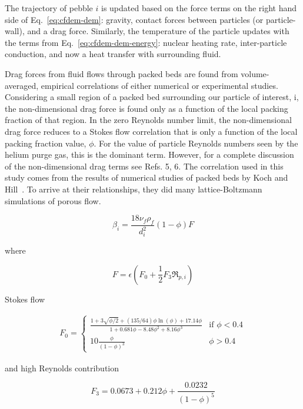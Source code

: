 The trajectory of pebble $i$ is updated based on the force terms on the right hand side of Eq.~\ref{eq:cfdem-dem}: gravity, contact forces between particles (or particle-wall), and a drag force. Similarly, the temperature of the particle updates with the terms from Eq.~\ref{eq:cfdem-dem-energy}: nuclear heating rate, inter-particle conduction, and now a heat transfer with surrounding fluid.

Drag forces from fluid flows through packed beds are found from volume-averaged, empirical correlations of either numerical or experimental studies. Considering a small region of a packed bed surrounding our particle of interest, i, the non-dimensional drag force is found only as a function of the local packing fraction of that region. In the zero Reynolds number limit, the non-dimensional drag force reduces to a Stokes flow correlation that is only a function of the local packing fraction value, $\phi$. For the value of particle Reynolds numbers seen by the helium purge gas, this is the dominant term. However, for a complete discussion of the non-dimensional drag terms see Refs. 5, 6. The correlation used in this study comes from the results of numerical studies of packed beds by Koch and Hill~\cite{Koch2001, Gruber2012, Benyahia2006}. To arrive at their relationships, they did many lattice-Boltzmann simulations of porous flow.

\begin{equation}
	\beta_{i} = \frac{18\nu_f\rho_f}{d_{i}^2}(1-\phi) F
\end{equation}

where 

\begin{equation}
	F = \epsilon (F_0 + \frac{1}{2}F_3 \Re_{p,i})
\end{equation}

Stokes flow

\begin{align}
F_0 = 
	\begin{cases}
    		\frac{1+3\sqrt{\phi/2} + (135/64)\phi\ln(\phi) + 17.14\phi}{1 + 0.681\phi - 8.48\phi^2 + 8.16 \phi^3}	& \text{if } \phi < 0.4\\
    		10\frac{\phi}{(1-\phi)^3}              																& \phi > 0.4
	\end{cases}
\end{align}

and high Reynolds contribution

\begin{equation}
	F_3 = 0.0673 + 0.212\phi + \frac{0.0232}{(1-\phi)^5}
\end{equation}



